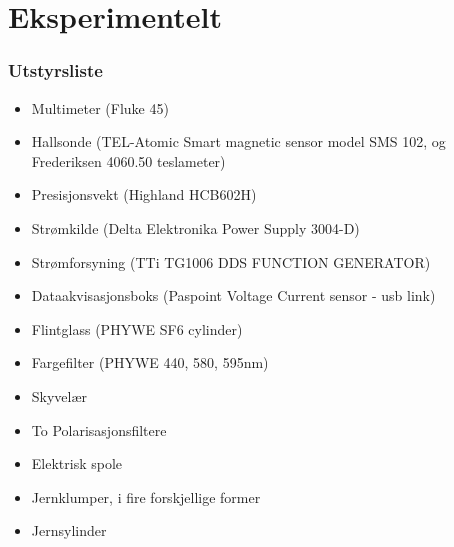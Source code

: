\documentclass[%
 reprint,
nofootinbib,
aps,
]{revtex4-1}
\begin{document}
\section{Eksperimentelt}
\subsubsection*{Utstyrsliste}
\begin{itemize}
  \item Multimeter (Fluke 45)
  \item Hallsonde (TEL-Atomic Smart magnetic sensor model SMS 102, og Frederiksen 4060.50 teslameter)
  \item Presisjonsvekt (Highland HCB602H)
  \item Strømkilde (Delta Elektronika Power Supply 3004-D)
  \item Strømforsyning (TTi TG1006 DDS FUNCTION GENERATOR)
  \item Dataakvisasjonsboks (Paspoint Voltage Current sensor - usb link)
  \item Flintglass (PHYWE SF6 cylinder)
  \item Fargefilter (PHYWE 440, 580, 595nm)
  \item Skyvelær
  \item To Polarisasjonsfiltere
  \item Elektrisk spole
  \item Jernklumper, i fire forskjellige former
  \item Jernsylinder
\end{itemize}
\end{document}
